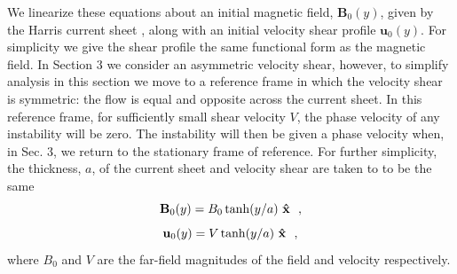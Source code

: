 	We linearize these equations about an initial magnetic field, $\mathbf{B}_0(y)$, given by the Harris current sheet \citep{Harris1962}, along with an initial velocity shear profile $\mathbf{u}_0(y)$.  For simplicity we give the shear profile the same functional form as the magnetic field. In Section 3 we consider an asymmetric velocity shear, however, to simplify analysis in this section we move to a reference frame in which the velocity shear is symmetric: the flow is equal and opposite across the current sheet. In this reference frame, for sufficiently small shear velocity $V$, the phase velocity of any instability will be zero.  The instability will then be given a phase velocity when, in Sec. 3, we return to the stationary frame of reference.  For further simplicity, the thickness, $a$, of the current sheet and velocity shear are taken to to be the same
		\begin{equation}
			\mathbf{B}_0 (y)= B_0 \tanh(y/a) \ \bf\hat{x}~~,
		\end{equation}
		\begin{equation}
			\mathbf{u}_0(y) = V \tanh(y/a) \ \bf\hat{x}~~,
		\end{equation}
where $B_0$ and $V$ are the far-field magnitudes of the field and velocity respectively.
		
